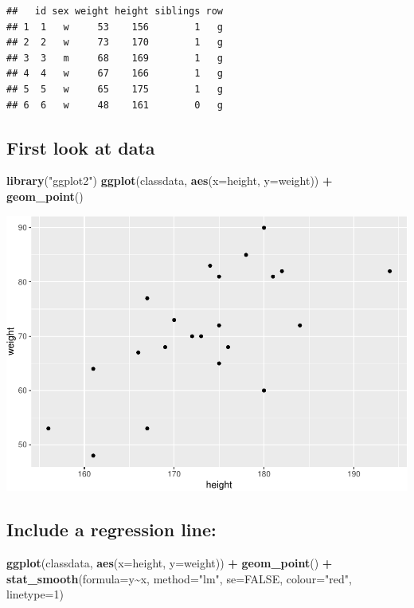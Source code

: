 \documentclass[
  doc]{apa6}
\newenvironment{Shaded}{\begin{snugshade}}{\end{snugshade}}
\newcommand{\AttributeTok}[1]{\textcolor[rgb]{0.13,0.29,0.53}{#1}}
\newcommand{\ConstantTok}[1]{\textcolor[rgb]{0.56,0.35,0.01}{#1}}
\newcommand{\DecValTok}[1]{\textcolor[rgb]{0.00,0.00,0.81}{#1}}
\newcommand{\FunctionTok}[1]{\textcolor[rgb]{0.13,0.29,0.53}{\textbf{#1}}}
\newcommand{\NormalTok}[1]{#1}
\newcommand{\SpecialCharTok}[1]{\textcolor[rgb]{0.81,0.36,0.00}{\textbf{#1}}}
\newcommand{\StringTok}[1]{\textcolor[rgb]{0.31,0.60,0.02}{#1}}
\begin{document}
\begin{verbatim}
##   id sex weight height siblings row
## 1  1   w     53    156        1   g
## 2  2   w     73    170        1   g
## 3  3   m     68    169        1   g
## 4  4   w     67    166        1   g
## 5  5   w     65    175        1   g
## 6  6   w     48    161        0   g
\end{verbatim}

\newpage

\subsection{First look at data}\label{first-look-at-data}

\begin{Shaded}
\begin{Highlighting}[]
\FunctionTok{library}\NormalTok{(}\StringTok{"ggplot2"}\NormalTok{)}
\FunctionTok{ggplot}\NormalTok{(classdata, }\FunctionTok{aes}\NormalTok{(}\AttributeTok{x=}\NormalTok{height, }\AttributeTok{y=}\NormalTok{weight)) }\SpecialCharTok{+} \FunctionTok{geom\_point}\NormalTok{() }
\end{Highlighting}
\end{Shaded}

\includegraphics{rmd_reg_files/figure-latex/pressure-1.pdf}

\newpage

\subsection{Include a regression line:}\label{include-a-regression-line}

\begin{Shaded}
\begin{Highlighting}[]
\FunctionTok{ggplot}\NormalTok{(classdata, }\FunctionTok{aes}\NormalTok{(}\AttributeTok{x=}\NormalTok{height, }\AttributeTok{y=}\NormalTok{weight)) }\SpecialCharTok{+}
  \FunctionTok{geom\_point}\NormalTok{() }\SpecialCharTok{+}
  \FunctionTok{stat\_smooth}\NormalTok{(}\AttributeTok{formula=}\NormalTok{y}\SpecialCharTok{\textasciitilde{}}\NormalTok{x, }\AttributeTok{method=}\StringTok{"lm"}\NormalTok{, }\AttributeTok{se=}\ConstantTok{FALSE}\NormalTok{, }\AttributeTok{colour=}\StringTok{"red"}\NormalTok{, }\AttributeTok{linetype=}\DecValTok{1}\NormalTok{)}
\end{Highlighting}
\end{Shaded}
\end{document}
